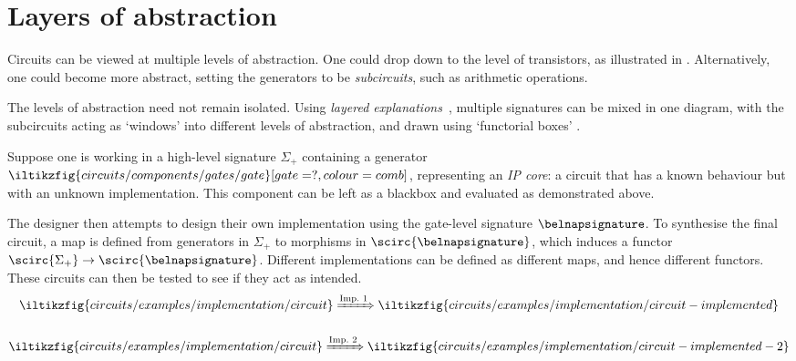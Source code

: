 \section{Layers of abstraction}\label{sec:abstraction}

Circuits can be viewed at multiple levels of abstraction.
One could drop down to the level of transistors, as illustrated in
\cite[Sec.\ 4.1]{ghica2017diagrammatic}.
Alternatively, one could become more abstract, setting the generators to be
\emph{subcircuits}, such as arithmetic operations.

The levels of abstraction need not remain isolated.
Using \emph{layered explanations}~\cite{lobski2022string}, multiple signatures
can be mixed in one diagram, with the subcircuits acting as `windows' into
different levels of abstraction, and drawn using `functorial boxes'
\cite{mellies2006functorial}.

\begin{example}[Implementation]
    Suppose one is working in a high-level signature \(\Sigma_+\) containing a
    generator \(
    \iltikzfig{circuits/components/gates/gate}[gate=?,colour=comb]
    \), representing an \emph{IP core}: a circuit that has a known behaviour but
    with an unknown implementation.
    This component can be left as a blackbox and evaluated as
    demonstrated above.

    The designer then attempts to design their own implementation using the
    gate-level signature \(\belnapsignature\).
    To synthesise the final circuit, a map is defined from generators in \(
    \Sigma_+
    \) to morphisms in \(\scirc{\belnapsignature}\), which induces a functor
    \(\scirc{\Sigma_+} \to \scirc{\belnapsignature}\).
    Different implementations can be defined as different maps, and hence
    different functors.
    These circuits can then be tested to see if they act as intended.
    \begin{gather*}
        \iltikzfig{circuits/examples/implementation/circuit}
        \xRightarrow{\text{Imp.\ 1}}
        \iltikzfig{circuits/examples/implementation/circuit-implemented}
        \\[1em]
        \iltikzfig{circuits/examples/implementation/circuit}
        \xRightarrow{\text{Imp.\ 2}}
        \iltikzfig{circuits/examples/implementation/circuit-implemented-2}
    \end{gather*}
\end{example}
